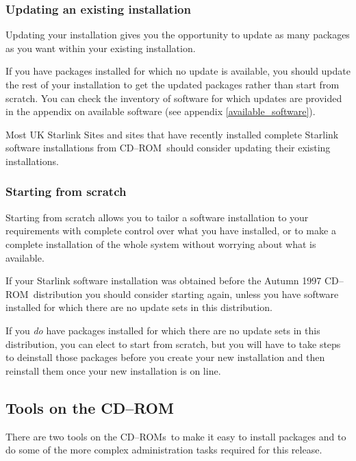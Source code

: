 \documentclass[twoside,11pt]{article}
\newcommand{\htmlref}[2]{#1}
\newcommand{\latex}[1]{#1}
\newcommand{\xlabel}[1]{}
\renewcommand{\_}{\texttt{\symbol{95}}}
\newcommand{\cdrom}{CD--ROM}
\newcommand{\cdrom}{CD-ROM}
\newcommand{\cdroms}{CD--ROMs}
\newcommand{\cdroms}{CD-ROMs}
\begin{document}
\subsubsection{Updating an existing installation}

Updating your installation gives you the opportunity to update as many
packages as you want within your existing installation.  

If you have packages installed for which no update is available, you
should update the rest of your installation to get the updated packages
rather than start from scratch.  You can check the inventory of software
for which updates are provided in the appendix on
\htmlref{available software}{available_software} \latex{(see appendix
\ref{available_software})}.

Most UK Starlink Sites and sites that have recently installed complete
Starlink software installations from \cdrom\ should consider updating 
their existing installations.

\subsubsection{\xlabel{starting_from_scratch}Starting from scratch}
\label{starting_from_scratch}

Starting from scratch allows you to tailor a software installation to your
requirements with complete control over what you have installed, or to
make a complete installation of the whole system without worrying about what
is available.   

If your Starlink software installation was obtained before the Autumn
1997 \cdrom\ distribution you should consider starting again, unless
you have software installed for which there are no update sets in this 
distribution.

If you \emph{do} have packages installed for which there are no
update sets in this distribution, you can elect to start from scratch,
but you will have to take steps to deinstall those packages before you
create your new installation and then reinstall them once your new
installation is on line.

\subsection{\xlabel{tools_on_the_cdrom}Tools on the \cdrom}
\label{tools_on_the_cdrom}

There are two tools on the \cdroms\ to make it easy to install packages
and to do some of the more complex administration tasks required for
this release.
\end{document}

